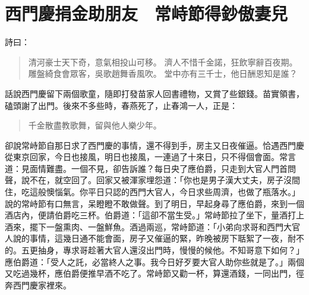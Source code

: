 
\chapter{西門慶捐金助朋友　常峙節得鈔傲妻兒}

詩曰：
\begin{quote}
清河豪士天下奇，意氣相投山可移。
濟人不惜千金諾，狂飲寧辭百夜期。
雕盤綺食會眾客，吳歌趙舞香風吹。
堂中亦有三千士，他日酬恩知是誰？
\end{quote}

話說西門慶留下兩個歌童，隨即打發苗家人回書禮物，又賞了些銀錢。苗實領書，磕頭謝了出門。後來不多些時，春燕死了，止春鴻一人，正是：
\begin{quote}
千金散盡教歌舞，留與他人樂少年。
\end{quote}

卻說常峙節自那日求了西門慶的事情，還不得到手，房主又日夜催逼。恰遇西門慶從東京回家，今日也接風，明日也接風，一連過了十來日，只不得個會面。常言道：見面情難盡。一個不見，卻告訴誰？每日央了應伯爵，只走到大官人門首問聲，說不在，就空回了。回家又被渾家埋怨道：「你也是男子漢大丈夫，房子沒間住，吃這般懊惱氣。你平日只認的西門大官人，今日求些周濟，也做了瓶落水。」說的常峙節有口無言，呆瞪瞪不敢做聲。到了明日，早起身尋了應伯爵，來到一個酒店內，便請伯爵吃三杯。伯爵道：「這卻不當生受。」常峙節拉了坐下，量酒打上酒來，擺下一盤熏肉、一盤鮮魚。酒過兩巡，常峙節道：「小弟向求哥和西門大官人說的事情，這幾日通不能會面，房子又催逼的緊，昨晚被房下聒絮了一夜，耐不的。五更抽身，專求哥趁著大官人還沒出門時，慢慢的候他。不知哥意下如何？」應伯爵道：「受人之託，必當終人之事。我今日好歹要大官人助你些就是了。」兩個又吃過幾杯，應伯爵便推早酒不吃了。常峙節又勸一杯，算還酒錢，一同出門，徑奔西門慶家裡來。

